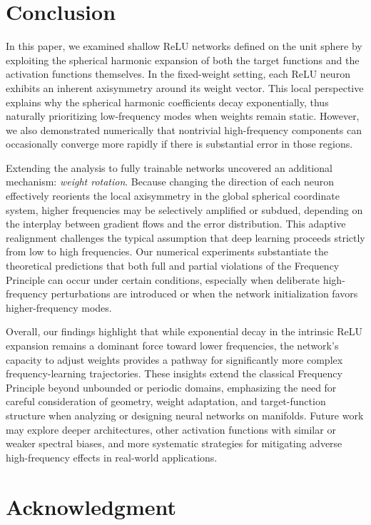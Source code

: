 \documentclass[review,onefignum,onetabnum,onealgnum]{siamart250106}
\numberwithin{theorem}{section}
\begin{document}
\section*{Conclusion}
In this paper, we examined shallow ReLU networks defined on the unit sphere by exploiting the spherical harmonic expansion of both the target functions and the activation functions themselves. In the fixed-weight setting, each ReLU neuron exhibits an inherent axisymmetry around its weight vector. This local perspective explains why the spherical harmonic coefficients decay exponentially, thus naturally prioritizing low-frequency modes when weights remain static. However, we also demonstrated numerically that nontrivial high-frequency components can occasionally converge more rapidly if there is substantial error in those regions.

Extending the analysis to fully trainable networks uncovered an additional mechanism: \emph{weight rotation}. Because changing the direction of each neuron effectively reorients the local axisymmetry in the global spherical coordinate system, higher frequencies may be selectively amplified or subdued, depending on the interplay between gradient flows and the error distribution. This adaptive realignment challenges the typical assumption that deep learning proceeds strictly from low to high frequencies. Our numerical experiments substantiate the theoretical predictions that both full and partial violations of the Frequency Principle can occur under certain conditions, especially when deliberate high-frequency perturbations are introduced or when the network initialization favors higher-frequency modes.

Overall, our findings highlight that while exponential decay in the intrinsic ReLU expansion remains a dominant force toward lower frequencies, the network’s capacity to adjust weights provides a pathway for significantly more complex frequency-learning trajectories. These insights extend the classical Frequency Principle beyond unbounded or periodic domains, emphasizing the need for careful consideration of geometry, weight adaptation, and target-function structure when analyzing or designing neural networks on manifolds. Future work may explore deeper architectures, other activation functions with similar or weaker spectral biases, and more systematic strategies for mitigating adverse high-frequency effects in real-world applications.

\section{Acknowledgment}
\end{document}
